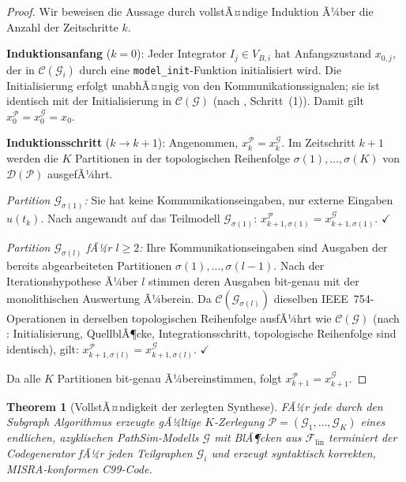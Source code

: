 ﻿\documentclass[12pt,a4paper]{article}
\newtheorem{theorem}{Theorem}[section]
\theoremstyle{definition}
\begin{document}
\begin{proof}
Wir beweisen die Aussage durch vollstÃ¤ndige Induktion Ã¼ber die Anzahl
der Zeitschritte $k$.

\medskip
\textbf{Induktionsanfang} ($k = 0$):
Jeder Integrator $I_j \in V_{B,i}$ hat Anfangszustand $x_{0,j}$, der
in $\mathcal{C}(\mathcal{G}_i)$ durch eine \texttt{model\_init}-Funktion
initialisiert wird. Die Initialisierung erfolgt unabhÃ¤ngig von den
Kommunikationssignalen; sie ist identisch mit der Initialisierung in
$\mathcal{C}(\mathcal{G})$ (nach , Schritt~(1)).
Damit gilt $x_0^{\mathcal{P}} = x_0^{\mathcal{G}} = x_0$.

\medskip
\textbf{Induktionsschritt} ($k \to k+1$):
Angenommen, $x_k^{\mathcal{P}} = x_k^{\mathcal{G}}$.
Im Zeitschritt $k+1$ werden die $K$ Partitionen in der topologischen
Reihenfolge $\sigma(1), \ldots, \sigma(K)$ von $\mathcal{D}(\mathcal{P})$
ausgefÃ¼hrt.

\emph{Partition $\mathcal{G}_{\sigma(1)}$:}
Sie hat keine Kommunikationseingaben, nur externe Eingaben $u(t_k)$.
Nach  angewandt auf das Teilmodell $\mathcal{G}_{\sigma(1)}$:
$x_{k+1,\sigma(1)}^{\mathcal{P}} = x_{k+1,\sigma(1)}^{\mathcal{G}}$.
$\checkmark$

\emph{Partition $\mathcal{G}_{\sigma(l)}$ fÃ¼r $l \geq 2$:}
Ihre Kommunikationseingaben sind Ausgaben der bereits abgearbeiteten
Partitionen $\sigma(1), \ldots, \sigma(l-1)$. Nach der Iterationshypothese
Ã¼ber $l$ stimmen deren Ausgaben bit-genau mit der monolithischen Auswertung
Ã¼berein. Da $\mathcal{C}(\mathcal{G}_{\sigma(l)})$ dieselben IEEE~754-Operationen
in derselben topologischen Reihenfolge ausfÃ¼hrt wie $\mathcal{C}(\mathcal{G})$
(nach : Initialisierung, QuellblÃ¶cke, Integrationsschritt,
topologische Reihenfolge sind identisch), gilt:
$x_{k+1,\sigma(l)}^{\mathcal{P}} = x_{k+1,\sigma(l)}^{\mathcal{G}}$.
$\checkmark$

Da alle $K$ Partitionen bit-genau Ã¼bereinstimmen, folgt
$x_{k+1}^{\mathcal{P}} = x_{k+1}^{\mathcal{G}}$.
\end{proof}

\begin{theorem}[VollstÃ¤ndigkeit der zerlegten Synthese]
\label{thm:comp-complete}
FÃ¼r jede durch den Subgraph Algorithmus erzeugte gÃ¼ltige $K$-Zerlegung
$\mathcal{P} = (\mathcal{G}_1, \ldots, \mathcal{G}_K)$ eines endlichen,
azyklischen PathSim-Modells $\mathcal{G}$ mit BlÃ¶cken aus
$\mathcal{F}_{\mathrm{lin}}$ terminiert der Codegenerator fÃ¼r jeden
Teilgraphen $\mathcal{G}_i$ und erzeugt syntaktisch korrekten,
MISRA-konformen C99-Code.
\end{theorem}
\end{document}
